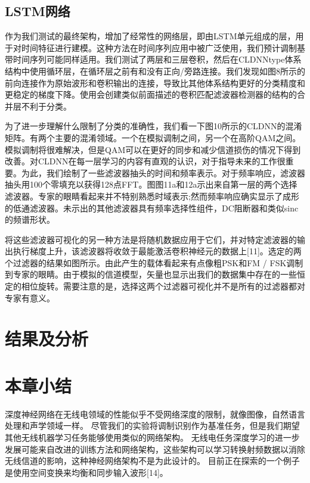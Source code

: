 \subsection{LSTM网络}

作为我们测试的最终架构，增加了经常性的网络层，即由LSTM单元组成的层，用于对时间特征进行建模。这种方法在时间序列应用中被广泛使用，我们预计调制基带时间序列可能同样适用。我们测试了两层和三层卷积，然后在CLDNNtype体系结构中使用循环层，在循环层之前有和没有正向/旁路连接。我们发现如图8所示的前向连接作为原始波形和卷积输出的连接，导致比其他体系结构更好的分类精度和更稳定的梯度下降。使用会创建类似前面描述的卷积匹配滤波器检测器的结构的合并层不利于分类。\par

为了进一步理解什么限制了分类的准确性，我们看一下图10所示的CLDNN的混淆矩阵。有两个主要的混淆领域。一个在模拟调制之间，另一个在高阶QAM之间。模拟调制将很难解决，但是QAM可以在更好的同步和减少信道损伤的情况下得到改善。对CLDNN在每一层学习的内容有直观的认识，对于指导未来的工作很重要。为此，我们绘制了一些滤波器抽头的时间和频率表示。对于频率响应，滤波器抽头用100个零填充以获得128点FFT。图图11a和12a示出来自第一层的两个选择滤波器。专家的眼睛看起来并不特别熟悉时域表示;然而频率响应确实显示了成形的低通滤波器。未示出的其他滤波器具有频率选择性组件，DC阻断器和类似sinc的频谱形状。\par

将这些滤波器可视化的另一种方法是将随机数据应用于它们，并对特定滤波器的输出执行梯度上升，该滤波器将收敛于最能激活卷积神经元的数据上[11]。选定的两个过滤器的结果如图所示。由此产生的载体看起来有点像粗PSK和FM / FSK调制到专家的眼睛。由于模拟的信道模型，矢量也显示出我们的数据集中存在的一些恒定的相位旋转。需要注意的是，选择这两个过滤器可视化并不是所有的过滤器都对专家有意义。\par


\section{结果及分析}

\section{本章小结}
深度神经网络在无线电领域的性能似乎不受网络深度的限制，就像图像，自然语言处理和声学领域一样。 尽管我们的实验将调制识别作为基准任务，但是我们期望其他无线机器学习任务能够使用类似的网络架构。 无线电任务深度学习的进一步发展可能来自改进的训练方法和网络架构，这些架构可以学习转换射频数据以消除无线信道的影响，这种神经网络架构不是为此设计的。 目前正在探索的一个例子是使用空间变换来均衡和同步输入波形[14]。